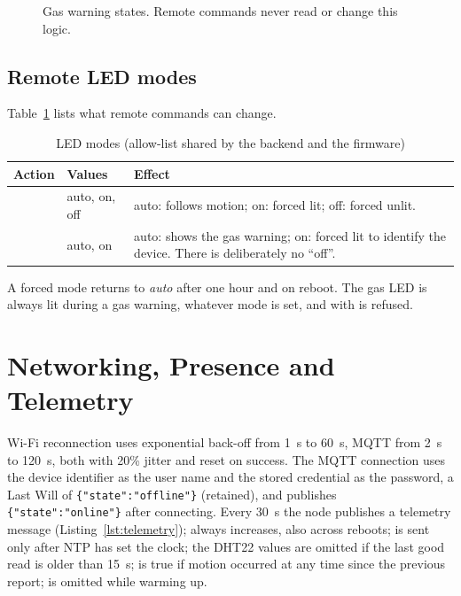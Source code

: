 \documentclass[12pt,a4paper,oneside]{report}
\newcommand{\code}[1]{\texttt{\detokenize{#1}}}
\begin{document}
\begin{figure}[H]
\centering
{}
\caption{Gas warning states. Remote commands never read or change this logic.}
\label{fig:gas-states}
\end{figure}

\subsection{Remote LED modes}
Table~\ref{tab:ledmodes} lists what remote commands can change.
\begin{table}[H]
\centering
\caption{LED modes (allow-list shared by the backend and the firmware)}
\label{tab:ledmodes}
\begin{tabularx}{\textwidth}{llX}
\toprule
\textbf{Action} & \textbf{Values} & \textbf{Effect}\\
\midrule
\code{set_pir_led} & auto, on, off & auto: follows motion; on: forced lit; off: forced unlit.\\
\code{set_gas_led} & auto, on & auto: shows the gas warning; on: forced lit to identify the device. There is deliberately no ``off''.\\
\bottomrule
\end{tabularx}
\end{table}
A forced mode returns to \emph{auto} after one hour and on reboot. The gas LED is always lit during a gas warning, whatever mode is set, and \code{set_gas_led} with \code{off} is refused.

\section{Networking, Presence and Telemetry}
Wi-Fi reconnection uses exponential back-off from 1~s to 60~s, MQTT from 2~s to 120~s, both with 20\% jitter and reset on success. The MQTT connection uses the device identifier as the user name and the stored credential as the password, a Last Will of \texttt{\{"state":"offline"\}} (retained), and publishes \texttt{\{"state":"online"\}} after connecting. Every 30~s the node publishes a telemetry message (Listing~\ref{lst:telemetry}); \code{seq} always increases, also across reboots; \code{ts} is sent only after NTP has set the clock; the DHT22 values are omitted if the last good read is older than 15~s; \code{motion} is true if motion occurred at any time since the previous report; \code{gasRaw} is omitted while warming up.
\end{document}
